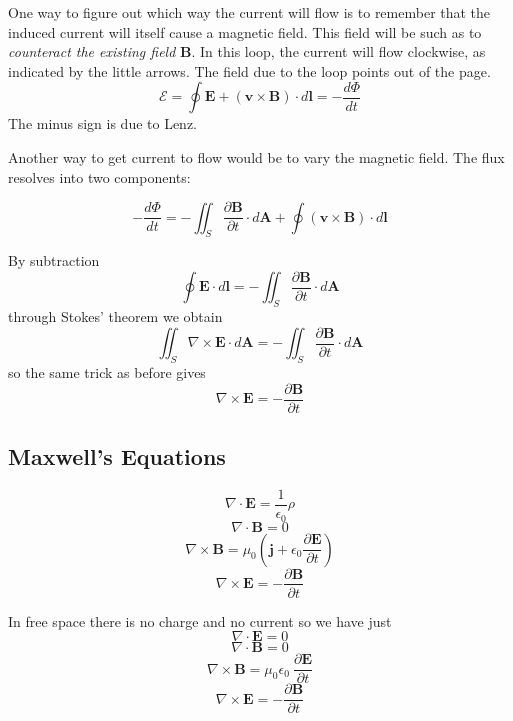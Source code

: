 \documentclass[11pt, oneside]{article}   	%
\begin{document}
One way to figure out which way the current will flow is to remember that the induced current will itself cause a magnetic field.  This field will be such as to \emph{counteract the existing field} $\mathbf{B}$.  In this loop, the current will flow clockwise, as indicated by the little arrows.  The field due to the loop points out of the page.
\[ \mathcal{E} = \oint \mathbf{E} + (\mathbf{v} \times \mathbf{B}) \cdot d\mathbf{l} = - \frac{d\Phi}{dt} \]
The minus sign is due to Lenz.

Another way to get current to flow would be to vary the magnetic field.  The flux resolves into two components:

\[ - \frac{d\Phi}{dt}=  -\iint_S \frac{\partial \mathbf{B}}{\partial t} \cdot d\mathbf{A} + \oint (\mathbf{v} \times \mathbf{B}) \cdot d\mathbf{l} \]

By subtraction
\[ \oint \mathbf{E} \cdot d\mathbf{l} = -\iint_S \frac{\partial \mathbf{B}}{\partial t} \cdot d\mathbf{A} \]
through Stokes' theorem we obtain
\[ \iint_S \nabla \times \mathbf{E} \cdot d\mathbf{A} = -\iint_S \frac{\partial \mathbf{B}}{\partial t} \cdot d\mathbf{A} \] 
so the same trick as before gives
\[ \nabla \times \mathbf{E} = - \frac{\partial \mathbf{B}}{\partial t}  \]

\subsection*{Maxwell's Equations}
\[ \nabla \cdot \mathbf{E} = \frac{1}{\epsilon_0} \rho \]
\[ \nabla \cdot \mathbf{B} = 0 \]
\[ \nabla \times \mathbf{B} = \mu_0 (\mathbf{j} + \epsilon_0 \frac{\partial \mathbf{E}}{\partial t} )  \]
\[ \nabla \times \mathbf{E} = - \frac{\partial \mathbf{B}}{\partial t}  \]

In free space there is no charge and no current so we have just
\[ \nabla \cdot \mathbf{E} = 0 \]
\[ \nabla \cdot \mathbf{B} = 0 \]
\[ \nabla \times \mathbf{B} = \mu_0 \epsilon_0 \ \frac{\partial \mathbf{E}}{\partial t}  \]
\[ \nabla \times \mathbf{E} = - \frac{\partial \mathbf{B}}{\partial t}  \]
\end{document}
